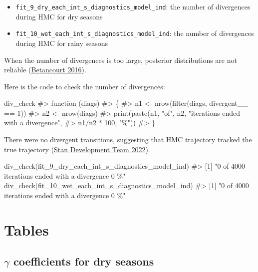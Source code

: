 \documentclass[
  11pt,
  letterpaper,
  DIV=11,
  numbers=noendperiod]{scrartcl}
\newenvironment{Shaded}{}{}
\newcommand{\CommentTok}[1]{\textcolor[rgb]{0.42,0.45,0.49}{#1}}
\newcommand{\FunctionTok}[1]{\textcolor[rgb]{0.44,0.26,0.76}{#1}}
\newcommand{\NormalTok}[1]{\textcolor[rgb]{0.14,0.16,0.18}{#1}}
\begin{document}
\begin{itemize}
\item
  \texttt{fit\_9\_dry\_each\_int\_s\_diagnostics\_model\_ind}: the
  number of divergences during HMC for dry seasons
\item
  \texttt{fit\_10\_wet\_each\_int\_s\_diagnostics\_model\_ind}: the
  number of divergences during HMC for rainy seasons
\end{itemize}

When the number of divergences is too large, posterior distributions are
not reliable (\protect\hyperlink{ref-Betancourt2016}{Betancourt 2016}).

Here is the code to check the number of divergences:

\begin{Shaded}
\begin{Highlighting}[]
\NormalTok{div\_check}
\CommentTok{\#\textgreater{} function (diags) }
\CommentTok{\#\textgreater{} \{}
\CommentTok{\#\textgreater{}     n1 \textless{}{-} nrow(filter(diags, divergent\_\_ == 1))}
\CommentTok{\#\textgreater{}     n2 \textless{}{-} nrow(diags)}
\CommentTok{\#\textgreater{}     print(paste(n1, "of", n2, "iterations ended with a divergence", }
\CommentTok{\#\textgreater{}         n1/n2 * 100, "\%"))}
\CommentTok{\#\textgreater{} \}}
\end{Highlighting}
\end{Shaded}

There were no divergent transitions, suggesting that HMC trajectory
tracked the true trajectory
(\protect\hyperlink{ref-StanDevelopmentTeam2022}{Stan Development Team
2022}).

\begin{Shaded}
\begin{Highlighting}[]
\FunctionTok{div\_check}\NormalTok{(fit\_9\_dry\_each\_int\_s\_diagnostics\_model\_ind)}
\CommentTok{\#\textgreater{} [1] "0 of 4000 iterations ended with a divergence 0 \%"}
\FunctionTok{div\_check}\NormalTok{(fit\_10\_wet\_each\_int\_s\_diagnostics\_model\_ind)}
\CommentTok{\#\textgreater{} [1] "0 of 4000 iterations ended with a divergence 0 \%"}
\end{Highlighting}
\end{Shaded}

\hypertarget{tables}{%
\section{Tables}\label{tables}}

\hypertarget{gamma-coefficients-for-dry-seasons}{%
\subsection{\texorpdfstring{\(\gamma\) coefficients for dry
seasons}{\textbackslash gamma coefficients for dry seasons}}\label{gamma-coefficients-for-dry-seasons}}
\end{document}
